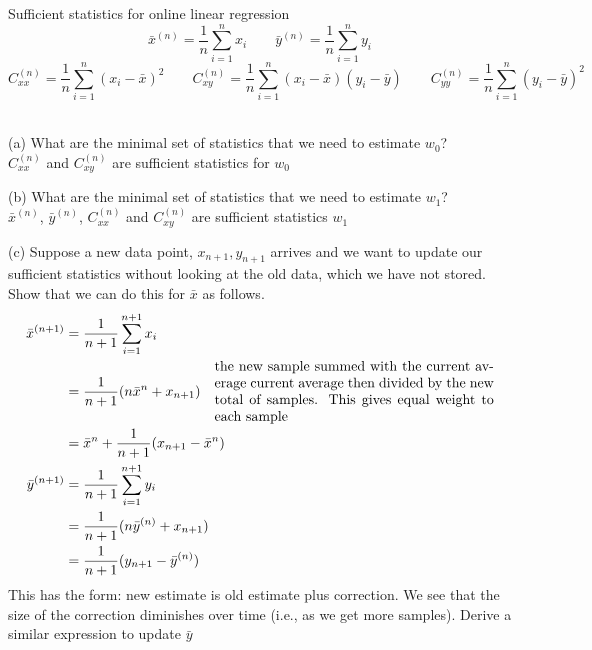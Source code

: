 \documentclass[draft]{exam} %
\theoremstyle{definition} \newtheorem*{defn}{Definition}
\begin{document}
\begin{questions}
 Sufficient statistics for online linear regression \\
$$\bar{x}^{(n)} = \frac{1}{n} \sum_{i=1}^{n} x_i \qquad \bar{y}^{(n)} = \frac{1}{n} \sum_{i=1}^{n} y_i$$
$$C_{xx}^{(n)} = \frac{1}{n} \sum_{i=1}^{n} (x_i - \bar{x})^2 \qquad C_{xy}^{(n)} = \frac{1}{n} \sum_{i=1}^{n} (x_i-\bar{x})(y_i - \bar{y}) \qquad C_{yy}^{(n)} = \frac{1}{n} \sum_{i=1}^{n}(y_i - \bar{y})^2$$

\begin{solution}  \\%
(a) What are the minimal set of statistics that we need to estimate $w_0$?\\
$C_{xx}^(n)$ and $C_{xy}^{(n)}$ are sufficient statistics for $w_0$

(b) What are the minimal set of statistics that we need to estimate $w_1$?\\
$\bar{x}^{(n)}$, $\bar{y}^{(n)}$, $C_{xx}^(n)$ and $C_{xy}^{(n)}$ are sufficient statistics $w_1$

(c) Suppose a new data point, $x_{n+1}, y_{n+1}$ arrives and we want to update our sufficient statistics without looking at the old data, which we have not stored.  Show that we can do this for $\bar{x}$ as follows.\\
\begin{align*}
\bar{x}^{(n+1)} & = \frac{1}{n+1} \sum_{i=1}^{n+1} x_i \\
& = \frac{1}{n+1} (n \bar{x}^{n} + x_{n+1}) \quad \parbox{20em}{the new sample summed with the current average current average then divided by the new total of samples.  This gives equal weight to each sample} \\
& = \bar{x}^{n} + \frac{1}{n+1} (x_{n+1} - \bar{x}^{n}) \\
\bar{y}^{(n+1)} & = \frac{1}{n+1} \sum_{i=1}^{n+1} y_i \\
& = \frac{1}{n+1} (n \bar{y}^{(n)} + x_{n+1}) \\
& = \frac{1}{n+1} (y_{n+1} - \bar{y}^{(n)})
\end{align*}
This has the form: new estimate is old estimate plus correction.  We see that the size of the correction diminishes over time (i.e., as we get more samples).  Derive a similar expression to update $\bar{y}$\\


\end{solution}
\end{questions}
\end{document}
